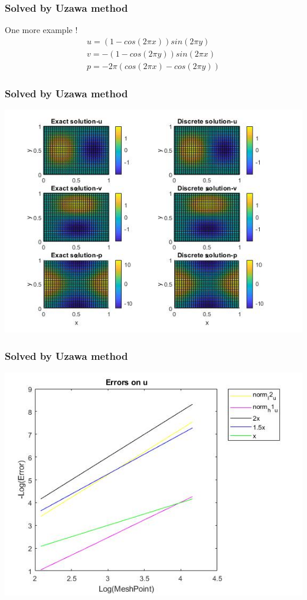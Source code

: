 \documentclass[11pt]{beamer}
\numberwithin{equation}{section}
\theoremstyle{plain}
\theoremstyle{definition}
\theoremstyle{remark}
\begin{document}
\begin{frame}\frametitle{Solved by Uzawa method}
One more example ! 
\begin{align*}
u=(1-cos(2\pi x))sin(2 \pi y) \\
v=-(1-cos(2\pi y))sin(2 \pi x) \\
p=-2\pi(cos(2\pi x)-cos(2\pi y)) 
\end{align*}
\end{frame}
\begin{frame}\frametitle{Solved by Uzawa method}
\begin{center}
\includegraphics[scale=0.45]{14}
\end{center}
\end{frame}
\begin{frame}\frametitle{Solved by Uzawa method}
\includegraphics[scale=0.5]{15}
\end{frame}
\end{document}
